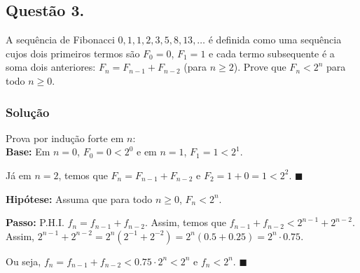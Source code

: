 \documentclass[12pt, letterpaper]{report}
\newcommand*{\CQD}{\hfill\ensuremath{\blacksquare}}%
\newcounter{ProblemNum}
\newcommand*{\anyproblem}[1]{\newpage\subsection*{#1}}
\newcommand*{\problem}[1]{\stepcounter{ProblemNum} %
   \anyproblem{Questão #1}}
\newcommand*{\soln}[1]{\subsubsection*{#1}}
\newcommand*{\solution}{\soln{Solução}}
\begin{document}
\problem{3.}
  A sequência de Fibonacci $ 0, 1, 1, 2, 3, 5, 8, 13, \dots $ é definida como uma sequência cujos dois primeiros termos são $ F_0 = 0 $, $ F_1 = 1 $ e cada termo subsequente é a soma dois anteriores: $ F_n = F_{n - 1} + F_{n - 2} $ (para $ n \geq 2 $). Prove que $ F_n < 2^n $ para todo $ n \geq 0 $.

\solution
    Prova por indução forte em $n$: \\

    \textbf{Base:} Em $n = 0$, $F_0 = 0 < 2^0$ e em $n = 1$, $F_1 = 1 < 2^1$. 

    Já em $n = 2$, temos que $F_n = F_{n - 1} + F_{n - 2}$ e $F_2 = 1 + 0 = 1 < 2^2$. \CQD

    \textbf{Hipótese:} Assuma que para todo $n \geq 0$, $F_n < 2^n$.

    \textbf{Passo:} P.H.I. $f_n = f_{n - 1} + f_{n - 2}$. Assim, temos que $f_{n - 1} + f_{n - 2} < 2^{n - 1} + 2^{n - 2}$. Assim, $2^{n - 1} + 2^{n - 2} = 2^n(2^{-1} + 2^{-2}) = 2^n(0.5 + 0.25) = 2^n \cdot 0.75$. 

    Ou seja, $f_n = f_{n - 1} + f_{n - 2} < 0.75 \cdot 2^n < 2^n$ e $f_n < 2^n$. \CQD
\end{document}
